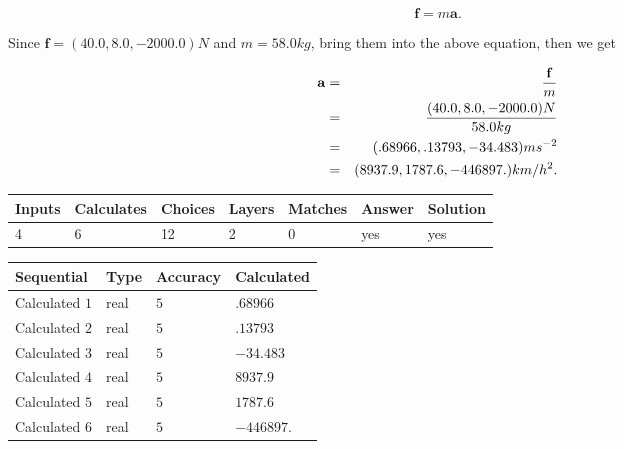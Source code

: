 \documentclass[12pt]{article}
\begin{document}
\[
\mathbf{f}=m\mathbf{a}.
\]
 
Since $\mathbf{f}=( %
40.0,  %
8.0,  %
-2000.0 )N$
and $m= %
58.0 kg$, bring them into the above equation, then we get
 
\begin{eqnarray*}
\mathbf{a}&=&\frac{\mathbf{f}}m  \\
&=&\frac{(
40.0 ,
8.0 ,
-2000.0 )N
}{ %
58.0 kg}  \\
&=&(
.68966 ,
.13793,
-34.483
)ms^{-2} \\
&=&(
8937.9 ,
1787.6 ,
-446897.
)km/h^2.
\end{eqnarray*}
 
 
 
\noindent{}
 
 

 
 
\vspace{0.3in}
   
   
   
   
\noindent\begin{tabular}{|l|l|l|l|l|l|l|}
 \hline
Inputs & Calculates & Choices & Layers & Matches & Answer & Solution \\ \hline
           4 & 
           6 & 
          12
  & 
           2 & 
           0 & 
  yes & 
  yes 
  \\ \hline
 \end{tabular}
   
   
   
   
\noindent{}
   
   
  
  
\noindent\begin{tabular}{|l|l|l|l|}
\hline
 Sequential & Type & Accuracy & Calculated \\ 
\hline
 
 
  Calculated $           1$ & real & $           5 $ & 
 $ .68966 $ 
 \\  \hline  
 
 
  Calculated $           2$ & real & $           5 $ & 
 $ .13793 $ 
 \\  \hline  
 
 
  Calculated $           3$ & real & $           5 $ & 
 $ -34.483 $ 
 \\  \hline  
 
 
  Calculated $           4$ & real & $           5 $ & 
 $ 8937.9 $ 
 \\  \hline  
 
 
  Calculated $           5$ & real & $           5 $ & 
 $ 1787.6 $ 
 \\  \hline  
 
 
  Calculated $           6$ & real & $           5 $ & 
 $ -446897. $ 
 \\  \hline  
 \end{tabular}
   
\end{document}
